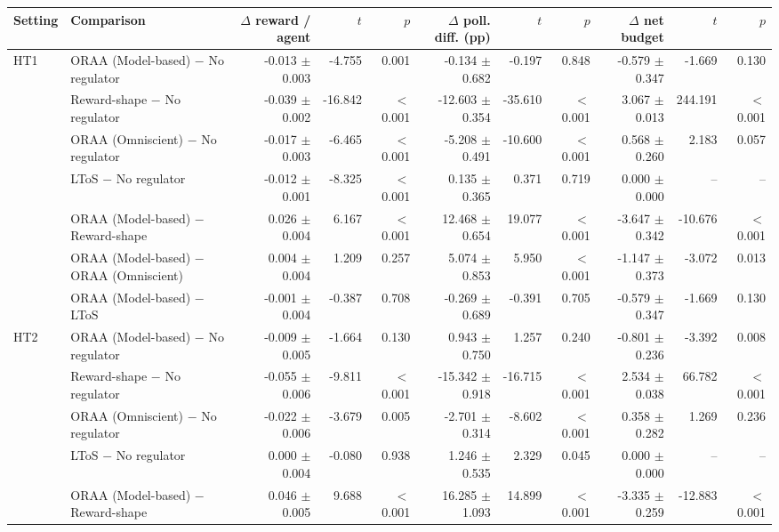 \begin{tabular}{llrrrrrrrrr}
\toprule
Setting & Comparison & $\Delta$ reward / agent & $t$ & $p$ & $\Delta$ poll. diff. (pp) & $t$ & $p$ & $\Delta$ net budget & $t$ & $p$ \\
\midrule
HT1 & ORAA (Model-based) $-$ No regulator & -0.013 $\pm$ 0.003 & -4.755 & 0.001 & -0.134 $\pm$ 0.682 & -0.197 & 0.848 & -0.579 $\pm$ 0.347 & -1.669 & 0.130 \\
 & Reward-shape $-$ No regulator & -0.039 $\pm$ 0.002 & -16.842 & $<$0.001 & -12.603 $\pm$ 0.354 & -35.610 & $<$0.001 & 3.067 $\pm$ 0.013 & 244.191 & $<$0.001 \\
 & ORAA (Omniscient) $-$ No regulator & -0.017 $\pm$ 0.003 & -6.465 & $<$0.001 & -5.208 $\pm$ 0.491 & -10.600 & $<$0.001 & 0.568 $\pm$ 0.260 & 2.183 & 0.057 \\
 & LToS $-$ No regulator & -0.012 $\pm$ 0.001 & -8.325 & $<$0.001 & 0.135 $\pm$ 0.365 & 0.371 & 0.719 & 0.000 $\pm$ 0.000 & -- & -- \\
 & ORAA (Model-based) $-$ Reward-shape & 0.026 $\pm$ 0.004 & 6.167 & $<$0.001 & 12.468 $\pm$ 0.654 & 19.077 & $<$0.001 & -3.647 $\pm$ 0.342 & -10.676 & $<$0.001 \\
 & ORAA (Model-based) $-$ ORAA (Omniscient) & 0.004 $\pm$ 0.004 & 1.209 & 0.257 & 5.074 $\pm$ 0.853 & 5.950 & $<$0.001 & -1.147 $\pm$ 0.373 & -3.072 & 0.013 \\
 & ORAA (Model-based) $-$ LToS & -0.001 $\pm$ 0.004 & -0.387 & 0.708 & -0.269 $\pm$ 0.689 & -0.391 & 0.705 & -0.579 $\pm$ 0.347 & -1.669 & 0.130 \\
\addlinespace
HT2 & ORAA (Model-based) $-$ No regulator & -0.009 $\pm$ 0.005 & -1.664 & 0.130 & 0.943 $\pm$ 0.750 & 1.257 & 0.240 & -0.801 $\pm$ 0.236 & -3.392 & 0.008 \\
 & Reward-shape $-$ No regulator & -0.055 $\pm$ 0.006 & -9.811 & $<$0.001 & -15.342 $\pm$ 0.918 & -16.715 & $<$0.001 & 2.534 $\pm$ 0.038 & 66.782 & $<$0.001 \\
 & ORAA (Omniscient) $-$ No regulator & -0.022 $\pm$ 0.006 & -3.679 & 0.005 & -2.701 $\pm$ 0.314 & -8.602 & $<$0.001 & 0.358 $\pm$ 0.282 & 1.269 & 0.236 \\
 & LToS $-$ No regulator & 0.000 $\pm$ 0.004 & -0.080 & 0.938 & 1.246 $\pm$ 0.535 & 2.329 & 0.045 & 0.000 $\pm$ 0.000 & -- & -- \\
 & ORAA (Model-based) $-$ Reward-shape & 0.046 $\pm$ 0.005 & 9.688 & $<$0.001 & 16.285 $\pm$ 1.093 & 14.899 & $<$0.001 & -3.335 $\pm$ 0.259 & -12.883 & $<$0.001 \\

\end{tabular}
